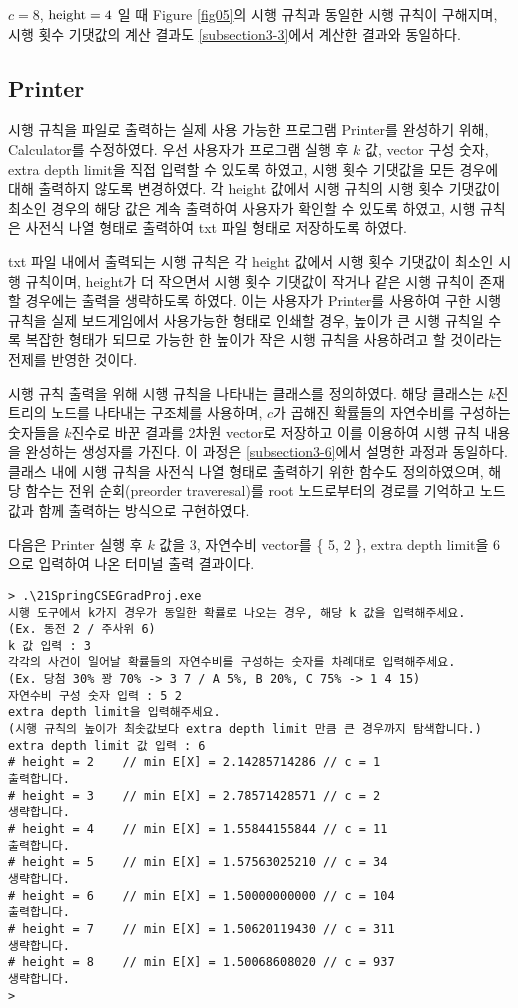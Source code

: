 \documentclass[11pt]{article}
\begin{document}
$c = 8$, $\textnormal{height} = 4$ 일 때 Figure \ref{fig05}의 시행 규칙과 동일한 시행 규칙이 구해지며, 시행 횟수 기댓값의 계산 결과도 \ref{subsection3-3}에서 계산한 결과와 동일하다.

\subsection{Printer} \label{subsection4-3}
시행 규칙을 파일로 출력하는 실제 사용 가능한 프로그램 Printer를 완성하기 위해, Calculator를 수정하였다. 우선 사용자가 프로그램 실행 후 $k$ 값, vector 구성 숫자, extra depth limit을 직접 입력할 수 있도록 하였고, 시행 횟수 기댓값을 모든 경우에 대해 출력하지 않도록 변경하였다. 각 height 값에서 시행 규칙의 시행 횟수 기댓값이 최소인 경우의 해당 값은 계속 출력하여 사용자가 확인할 수 있도록 하였고, 시행 규칙은 사전식 나열 형태로 출력하여 txt 파일 형태로 저장하도록 하였다.

txt 파일 내에서 출력되는 시행 규칙은 각 height 값에서 시행 횟수 기댓값이 최소인 시행 규칙이며, height가 더 작으면서 시행 횟수 기댓값이 작거나 같은 시행 규칙이 존재할 경우에는 출력을 생략하도록 하였다. 이는 사용자가 Printer를 사용하여 구한 시행 규칙을 실제 보드게임에서 사용가능한 형태로 인쇄할 경우, 높이가 큰 시행 규칙일 수록 복잡한 형태가 되므로 가능한 한 높이가 작은 시행 규칙을 사용하려고 할 것이라는 전제를 반영한 것이다.

시행 규칙 출력을 위해 시행 규칙을 나타내는 클래스를 정의하였다. 해당 클래스는 $k$진 트리의 노드를 나타내는 구조체를 사용하며, $c$가 곱해진 확률들의 자연수비를 구성하는 숫자들을 $k$진수로 바꾼 결과를 2차원 vector로 저장하고 이를 이용하여 시행 규칙 내용을 완성하는 생성자를 가진다. 이 과정은 \ref{subsection3-6}에서 설명한 과정과 동일하다. 클래스 내에 시행 규칙을 사전식 나열 형태로 출력하기 위한 함수도 정의하였으며, 해당 함수는 전위 순회(preorder traveresal)를 root 노드로부터의 경로를 기억하고 노드 값과 함께 출력하는 방식으로 구현하였다.

다음은 Printer 실행 후 $k$ 값을 3, 자연수비 vector를 \{ 5, 2 \}, extra depth limit을 6으로 입력하여 나온 터미널 출력 결과이다.

\singlespacing
\begin{verbatim}
> .\21SpringCSEGradProj.exe
시행 도구에서 k가지 경우가 동일한 확률로 나오는 경우, 해당 k 값을 입력해주세요.
(Ex. 동전 2 / 주사위 6)
k 값 입력 : 3
각각의 사건이 일어날 확률들의 자연수비를 구성하는 숫자를 차례대로 입력해주세요.
(Ex. 당첨 30% 꽝 70% -> 3 7 / A 5%, B 20%, C 75% -> 1 4 15)
자연수비 구성 숫자 입력 : 5 2
extra depth limit을 입력해주세요.
(시행 규칙의 높이가 최솟값보다 extra depth limit 만큼 큰 경우까지 탐색합니다.)
extra depth limit 값 입력 : 6
# height = 2    // min E[X] = 2.14285714286 // c = 1
출력합니다.
# height = 3    // min E[X] = 2.78571428571 // c = 2
생략합니다.
# height = 4    // min E[X] = 1.55844155844 // c = 11
출력합니다.
# height = 5    // min E[X] = 1.57563025210 // c = 34
생략합니다.
# height = 6    // min E[X] = 1.50000000000 // c = 104
출력합니다.
# height = 7    // min E[X] = 1.50620119430 // c = 311
생략합니다.
# height = 8    // min E[X] = 1.50068608020 // c = 937
생략합니다.
>
\end{verbatim}
\doublespacing
\end{document}
